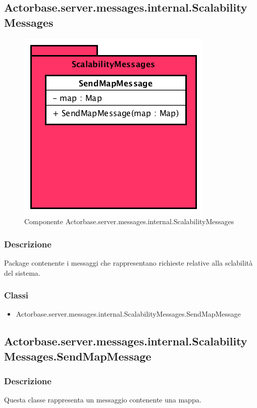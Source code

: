 \documentclass[a4paper]{article}
\begin{document}
\subsection{Actorbase.server.messages.internal.ScalabilityMessages}		
			\begin{figure} [H]
				\centering
				\includegraphics[scale = 0.6]{ST/Server/ScalabilityMessages.png}
				\caption{Componente Actorbase.server.messages.internal.ScalabilityMessages}
			\end{figure}
			\subsubsection{Descrizione}
				Package contenente i messaggi che rappresentano richieste relative alla sclabilità del sistema.
				
			\subsubsection{Classi}
				\begin{itemize}
					\item Actorbase.server.messages.internal.ScalabilityMessages.SendMapMessage
				\end{itemize}

				
		\subsection{Actorbase.server.messages.internal.ScalabilityMessages.SendMapMessage}
			\subsubsection{Descrizione}
				Questa classe rappresenta un messaggio contenente una mappa. 
				
\end{document}
